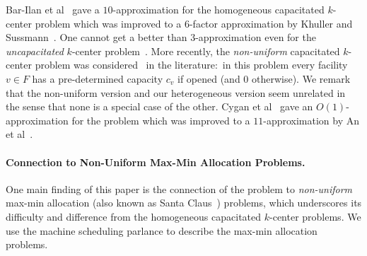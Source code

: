Bar-Ilan et al~\cite{Bar-IlanKP93} gave a $10$-approximation for the homogeneous capacitated $k$-center problem which was improved to a $6$-factor approximation by Khuller and Sussmann~\cite{KhullerS00}. One cannot get a better than $3$-approximation even for the {\em uncapacitated} $k$-center problem~\cite{HochbaumS85}. More recently, the {\em non-uniform} capacitated $k$-center problem was considered~\cite{CyganHK12, AnBCGMS14} in the literature:~in this problem every facility $v\in F$ has a pre-determined capacity $c_v$ if opened (and $0$ otherwise). We remark that the non-uniform version and our heterogeneous version seem unrelated in the sense that none is a special case of the other.
Cygan et al~\cite{CyganHK12} gave an $O(1)$-approximation for the problem which was improved to a $11$-approximation by An et al~\cite{AnBCGMS14}.




%
%
%
\paragraph{Connection to Non-Uniform Max-Min Allocation Problems.}
One main finding of this paper is the connection of the \mckc problem to {\em non-uniform} max-min allocation (also known as Santa Claus~\cite{BansalS06}) problems, which
 underscores its difficulty and difference from  the homogeneous capacitated $k$-center problems. %
We use the machine scheduling parlance to describe the max-min allocation problems.

